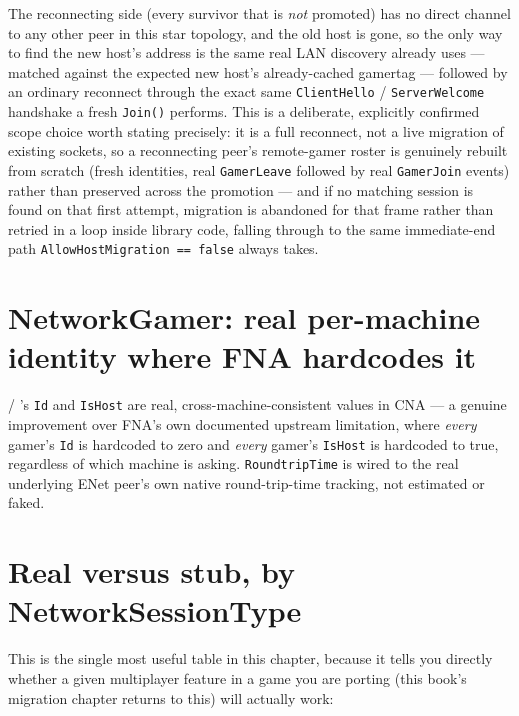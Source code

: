 The reconnecting side (every survivor that is \emph{not} promoted) has no direct channel to
any other peer in this star topology, and the old host is gone, so the only way to find the
new host's address is the same real LAN discovery  already
uses --- matched against the expected new host's already-cached gamertag --- followed by an
ordinary reconnect through the exact same \texttt{ClientHello} / \texttt{ServerWelcome} handshake
a fresh \texttt{Join()} performs. This is a deliberate, explicitly confirmed scope choice worth
stating precisely: it is a full reconnect, not a live migration of existing sockets, so a
reconnecting peer's remote-gamer roster is genuinely rebuilt from scratch (fresh
 identities, real \texttt{GamerLeave} followed by real \texttt{GamerJoin}
events) rather than preserved across the promotion --- and if no matching session is found on
that first attempt, migration is abandoned for that frame rather than retried in a loop inside
library code, falling through to the same immediate-end path \texttt{AllowHostMigration ==
false} always takes.

\section{NetworkGamer: real per-machine identity where FNA hardcodes it}

 / 's \texttt{Id} and \texttt{IsHost} are
real, cross-machine-consistent values in CNA --- a genuine improvement over FNA's own
documented upstream limitation, where \emph{every} gamer's \texttt{Id} is hardcoded to zero
and \emph{every} gamer's \texttt{IsHost} is hardcoded to true, regardless of which machine is
asking. \texttt{RoundtripTime} is wired to the real underlying ENet peer's own native
round-trip-time tracking, not estimated or faked.

\section{Real versus stub, by NetworkSessionType}

This is the single most useful table in this chapter, because it tells you directly whether
a given multiplayer feature in a game you are porting (this book's migration chapter returns
to this) will actually work:

